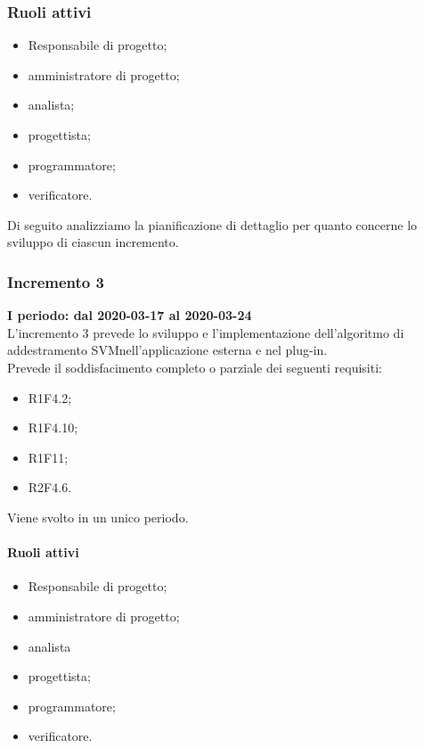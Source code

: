 \subsubsection*{Ruoli attivi}
\begin{itemize}
	\item Responsabile di progetto\glo;
	\item amministratore di progetto\glo;
	\item analista;
	\item progettista;
	\item programmatore;
	\item verificatore.
\end{itemize}
Di seguito analizziamo la pianificazione di dettaglio per quanto concerne lo sviluppo di ciascun incremento.

\subsubsection{Incremento 3}
\textbf{I periodo: dal 2020-03-17 al 2020-03-24} \\ 
L'incremento 3 prevede lo sviluppo e l'implementazione dell'algoritmo di addestramento SVM\glosp nell'applicazione esterna e nel plug-in. 
\\Prevede il soddisfacimento completo o parziale dei seguenti requisiti:
\begin{itemize}
	\item R1F4.2;
	\item R1F4.10;
	\item R1F11;
	\item R2F4.6.
\end{itemize}
Viene svolto in un unico periodo.
\paragraph{Ruoli attivi}
\begin{itemize}
	\item Responsabile di progetto\glo;
	\item amministratore di progetto\glo;
	\item analista
	\item progettista;
	\item programmatore;
	\item verificatore.
\end{itemize}
